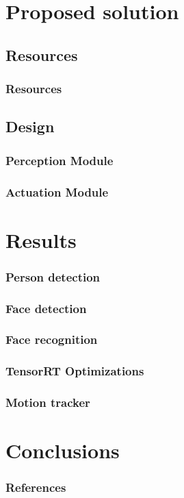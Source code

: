 \documentclass[11pt]{beamer}
\begin{document}
\section{Proposed solution}
\subsection{Resources}
\begin{frame}
	\frametitle{Resources}
\end{frame}
\subsection{Design}
\begin{frame}
	\frametitle{Perception Module}
\end{frame}

\begin{frame}
	\frametitle{Actuation Module}
\end{frame}

\section{Results}
\begin{frame}
	\frametitle{Person detection}
\end{frame}

\begin{frame}
	\frametitle{Face detection}
\end{frame}

\begin{frame}
	\frametitle{Face recognition}
\end{frame}

\begin{frame}
	\frametitle{TensorRT Optimizations}
\end{frame}

\begin{frame}
	\frametitle{Motion tracker}
\end{frame}

\section{Conclusions}

\begin{frame}[allowframebreaks]
	\frametitle{References}
	
	
\end{frame}
\end{document}
